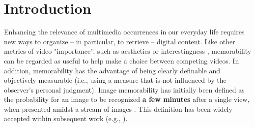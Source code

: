 \documentclass[sigconf]{acmart}
\begin{document}


\maketitle

\section{Introduction}%
Enhancing the relevance of multimedia occurrences in our everyday life requires new ways to organize -- in particular, to retrieve -- digital content.
Like other metrics of video "importance", such as aesthetics \cite{dhar_2011_high} or interestingness \cite{demarty_2016_mediaeval}, memorability can be regarded as useful to help make a choice between competing videos.
In addition, memorability has the advantage of being clearly definable and objectively measurable (i.e., using a measure that is not influenced by the observer's personal judgment).
Image memorability has initially been defined as the probability for an image to be recognized \textbf{a few minutes} after a single view, when presented amidst a stream
of images \cite{isola_2011_makes}.
This definition has been widely accepted within subsequent work (e.g., \cite{mancas_2013_memorability,kim_2013_relative,celikkale_2013_visual,khosla_2015_understanding,lahrache_2016_bag}).
\end{document}
